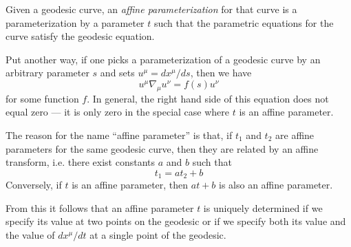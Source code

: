 \documentclass[12pt]{article}
\begin{document}
Given a geodesic curve, an \emph{affine parameterization} for that curve is a parameterization by a parameter $t$ such that the parametric equations for the curve satisfy the geodesic equation.

Put another way, if one picks a parameterization of a geodesic curve by an arbitrary parameter $s$ and sets $u^\mu = dx^\mu / ds$, then we have
 $$u^\mu \nabla_\mu u^\nu = f(s) u^\nu$$
for some function $f$.  In general, the right hand side of this equation does not equal zero --- it is only zero in the special case where $t$ is an affine parameter.

The reason for the name ``affine parameter'' is that, if $t_1$ and $t_2$ are affine parameters for the same geodesic curve, then they are related by an affine transform, i.e. there exist constants $a$ and $b$ such that
 \[t_1 = a t_2 + b\]
Conversely, if $t$ is an affine parameter, then $at + b$ is also an affine parameter.

From this it follows that an affine parameter $t$ is uniquely determined if we specify its value at two points on the geodesic or if we specify both its value and the value of $dx^\mu / dt$ at a single point of the geodesic.
\end{document}
